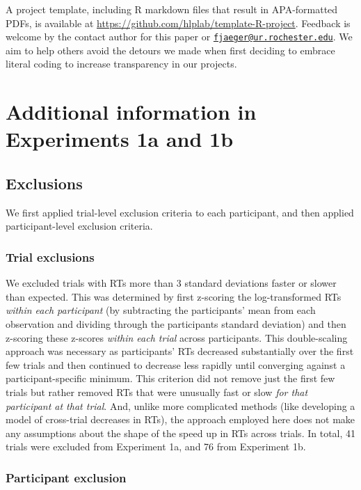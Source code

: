 \documentclass[preprint]{JASA}
\begin{document}
A project template, including R markdown files that result in APA-formatted PDFs, is available at \url{https://github.com/hlplab/template-R-project}. Feedback is welcome by the contact author for this paper or \href{mailto:fjaeger@ur.rochester.edu}{\nolinkurl{fjaeger@ur.rochester.edu}}. We aim to help others avoid the detours we made when first deciding to embrace literal coding to increase transparency in our projects.

\section{Additional information in Experiments 1a and 1b}\label{additional-information-in-experiments-1a-and-1b}

\subsection{Exclusions}\label{sec:SI-exclusions}

We first applied trial-level exclusion criteria to each participant, and then applied participant-level exclusion criteria.

\subsubsection{Trial exclusions}\label{trial-exclusions}

We excluded trials with RTs more than 3 standard deviations faster or slower than expected. This was determined by first z-scoring the log-transformed RTs \emph{within each participant} (by subtracting the participants' mean from each observation and dividing through the participants standard deviation) and then z-scoring these z-scores \emph{within each trial} across participants. This double-scaling approach was necessary as participants' RTs decreased substantially over the first few trials and then continued to decrease less rapidly until converging against a participant-specific minimum. This criterion did not remove just the first few trials but rather removed RTs that were unusually fast or slow \emph{for that participant at that trial}. And, unlike more complicated methods (like developing a model of cross-trial decreases in RTs), the approach employed here does not make any assumptions about the shape of the speed up in RTs across trials. In total, 41 trials were excluded from Experiment 1a, and 76 from Experiment 1b.

\subsubsection{Participant exclusion}\label{participant-exclusion}
\end{document}
